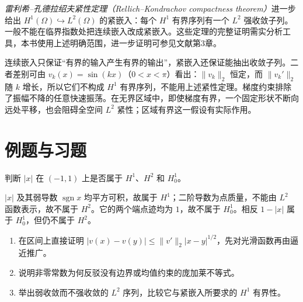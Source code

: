 \emph{雷利希--孔德拉绍夫紧性定理（Rellich--Kondrachov compactness theorem）}进一步给出 $H^1(\Omega)\hookrightarrow L^2(\Omega)$ 的紧嵌入：每个 $H^1$ 有界序列有一个 $L^2$ 强收敛子列。一般不能在临界指数处把连续嵌入改成紧嵌入。这些定理的完整证明需实分析工具，本书使用上述明确范围，进一步证明可参见文献\cite{hunter}第3章。

连续嵌入只保证“有界的输入产生有界的输出”，紧嵌入还保证能抽出收敛子列。二者差别可由 $v_k(x)=\sin(kx)$（$0<x<\pi$）看出：$\|v_k\|_2$ 恒定，而 $\|v_k'\|_2$ 随 $k$ 增长，所以它们不构成 $H^1$ 有界序列，不能用上述紧性定理。梯度约束排除了振幅不降的任意快速振荡。在无界区域中，即使梯度有界，一个固定形状不断向远处平移，也会阻碍全空间 $L^2$ 紧性；区域有界这一假设有实际作用。

\section{例题与习题}
\begin{example}
判断 $|x|$ 在 $(-1,1)$ 上是否属于 $H^1$、$H^2$ 和 $H_0^1$。
\end{example}
\begin{solve}
$|x|$ 及其弱导数 $\operatorname{sgn}x$ 均平方可积，故属于 $H^1$；二阶导数为点质量，不能由 $L^2$ 函数表示，故不属于 $H^2$。它的两个端点迹均为 $1$，故不属于 $H_0^1$。相反 $1-|x|$ 属于 $H_0^1$，但仍不属于 $H^2$。
\end{solve}
\begin{enumerate}
 \item 在区间上直接证明 $|v(x)-v(y)|\le\|v'\|_2|x-y|^{1/2}$，先对光滑函数再由逼近推广。
 \item 说明非零常数为何反驳没有边界或均值约束的庞加莱不等式。
 \item 举出弱收敛而不强收敛的 $L^2$ 序列，比较它与紧嵌入所要求的 $H^1$ 有界性。
\end{enumerate}

